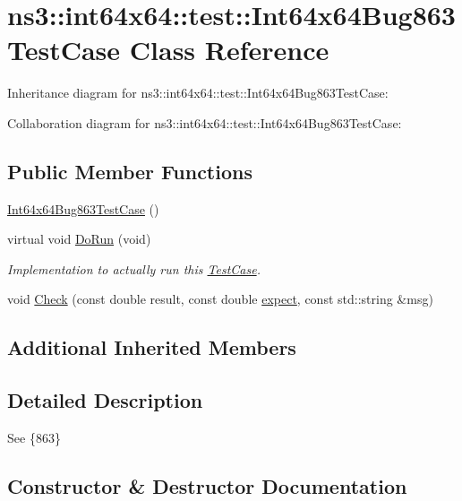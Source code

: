 \hypertarget{classns3_1_1int64x64_1_1test_1_1Int64x64Bug863TestCase}{}\section{ns3\+:\+:int64x64\+:\+:test\+:\+:Int64x64\+Bug863\+Test\+Case Class Reference}
\label{classns3_1_1int64x64_1_1test_1_1Int64x64Bug863TestCase}


Inheritance diagram for ns3\+:\+:int64x64\+:\+:test\+:\+:Int64x64\+Bug863\+Test\+Case\+:


Collaboration diagram for ns3\+:\+:int64x64\+:\+:test\+:\+:Int64x64\+Bug863\+Test\+Case\+:
\subsection*{Public Member Functions}
\begin{DoxyCompactItemize}
\item 
\hyperlink{classns3_1_1int64x64_1_1test_1_1Int64x64Bug863TestCase_a88f73e0490d00270de257c3c10ea668c}{Int64x64\+Bug863\+Test\+Case} ()
\item 
virtual void \hyperlink{classns3_1_1int64x64_1_1test_1_1Int64x64Bug863TestCase_a73cd9a88bacf4d168f7f0758ce93bbd8}{Do\+Run} (void)
\begin{DoxyCompactList}\small\item\em Implementation to actually run this \hyperlink{classns3_1_1TestCase}{Test\+Case}. \end{DoxyCompactList}\item 
void \hyperlink{classns3_1_1int64x64_1_1test_1_1Int64x64Bug863TestCase_a46ed5833f706bb28868ccae327b9ea32}{Check} (const double result, const double \hyperlink{doc_2readme_8txt_a11460adc33d00ccf94a559cdd45990ea}{expect}, const std\+::string \&msg)
\end{DoxyCompactItemize}
\subsection*{Additional Inherited Members}


\subsection{Detailed Description}
See \{863\} 

\subsection{Constructor \& Destructor Documentation}
